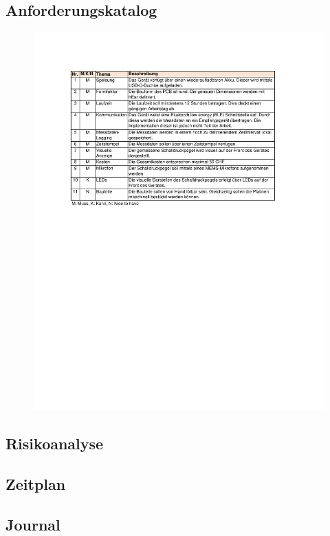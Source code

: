\documentclass[12pt]{article}
\begin{document}
	\newpage
	\subsection{Anforderungskatalog}\label{Anhang:Anforderungskatalog}
	\begin{figure}[H]
		\centering
		\includegraphics[trim= 2.5cm 5cm 0cm 3.5cm, width=1.2\linewidth]{images/BAT_Anforderungskatalog}
	\end{figure}
	
	\newpage
	\subsection{Risikoanalyse}\label{Anhang:Risikoanalyse}
		\begin{minipage}[b]{\textwidth}
		
	\end{minipage}
	
	\newpage
	\subsection{Zeitplan}\label{Anhang:Zeitplan}
	\begin{minipage}[b]{\textwidth}
		
	\end{minipage}
	
	\newpage
	\subsection{Journal}
	
\end{document}
